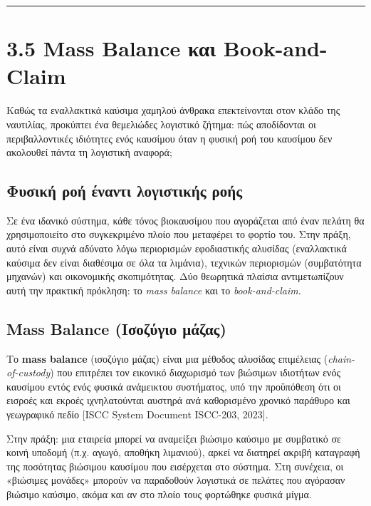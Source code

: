 \begin{center}\rule{0.5\linewidth}{0.5pt}\end{center}

\section{3.5 Mass Balance και
Book-and-Claim}\label{mass-balance-ux3baux3b1ux3b9-book-and-claim}

Καθώς τα εναλλακτικά καύσιμα χαμηλού άνθρακα επεκτείνονται στον κλάδο
της ναυτιλίας, προκύπτει ένα θεμελιώδες λογιστικό ζήτημα: πώς
αποδίδονται οι περιβαλλοντικές ιδιότητες ενός καυσίμου όταν η φυσική ροή
του καυσίμου δεν ακολουθεί πάντα τη λογιστική αναφορά;

\subsection{Φυσική ροή έναντι λογιστικής
ροής}\label{ux3c6ux3c5ux3c3ux3b9ux3baux3ae-ux3c1ux3bfux3ae-ux3adux3bdux3b1ux3bdux3c4ux3b9-ux3bbux3bfux3b3ux3b9ux3c3ux3c4ux3b9ux3baux3aeux3c2-ux3c1ux3bfux3aeux3c2}

Σε ένα ιδανικό σύστημα, κάθε τόνος βιοκαυσίμου που αγοράζεται από έναν
πελάτη θα χρησιμοποιείτο στο συγκεκριμένο πλοίο που μεταφέρει το φορτίο
του. Στην πράξη, αυτό είναι συχνά αδύνατο λόγω περιορισμών εφοδιαστικής
αλυσίδας (εναλλακτικά καύσιμα δεν είναι διαθέσιμα σε όλα τα λιμάνια),
τεχνικών περιορισμών (συμβατότητα μηχανών) και οικονομικής σκοπιμότητας.
Δύο θεωρητικά πλαίσια αντιμετωπίζουν αυτή την πρακτική πρόκληση: το
\emph{mass balance} και το \emph{book-and-claim}.

\subsection{Mass Balance (Ισοζύγιο
μάζας)}\label{mass-balance-ux3b9ux3c3ux3bfux3b6ux3cdux3b3ux3b9ux3bf-ux3bcux3acux3b6ux3b1ux3c2}

Το \textbf{mass balance} (ισοζύγιο μάζας) είναι μια μέθοδος αλυσίδας
επιμέλειας (\emph{chain-of-custody}) που επιτρέπει τον εικονικό
διαχωρισμό των βιώσιμων ιδιοτήτων ενός καυσίμου εντός ενός φυσικά
ανάμεικτου συστήματος, υπό την προϋπόθεση ότι οι εισροές και εκροές
ιχνηλατούνται αυστηρά ανά καθορισμένο χρονικό παράθυρο και γεωγραφικό
πεδίο {[}ISCC System Document ISCC-203, 2023{]}.

Στην πράξη: μια εταιρεία μπορεί να αναμείξει βιώσιμο καύσιμο με
συμβατικό σε κοινή υποδομή (π.χ. αγωγό, αποθήκη λιμανιού), αρκεί να
διατηρεί ακριβή καταγραφή της ποσότητας βιώσιμου καυσίμου που εισέρχεται
στο σύστημα. Στη συνέχεια, οι «βιώσιμες μονάδες» μπορούν να παραδοθούν
λογιστικά σε πελάτες που αγόρασαν βιώσιμο καύσιμο, ακόμα και αν στο
πλοίο τους φορτώθηκε φυσικά μίγμα.

